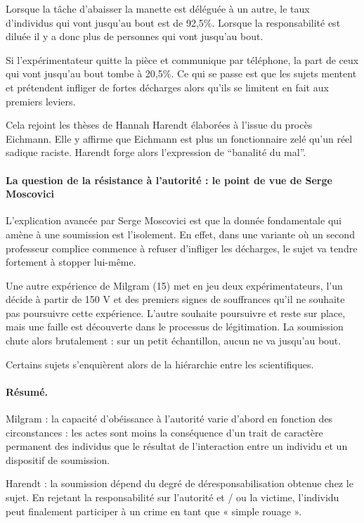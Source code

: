 	Lorsque la tâche d'abaisser la manette est déléguée à un autre, le taux d'individus qui vont jusqu'au bout est de 92,5\%.
	Lorsque la responsabilité est diluée il y a donc plus de personnes qui vont jusqu'au bout.

	Si l'expérimentateur quitte la pièce et communique par téléphone, la part de ceux qui vont jusqu'au bout tombe à 20,5\%. Ce qui se passe est que les sujets mentent et prétendent infliger de fortes décharges alors qu'ils se limitent en fait aux premiers leviers.

	Cela rejoint les thèses de Hannah Harendt élaborées à l'issue du procès Eichmann.
	Elle y affirme que Eichmann est plus un fonctionnaire zelé qu'un réel sadique raciste.
	Harendt forge alors l'expression de “banalité du mal”.

	\paragraph{La question de la résistance à l'autorité : le point de vue de Serge Moscovici}

	L'explication avancée par Serge Moscovici est que la donnée fondamentale qui amène à une soumission est l'isolement.
	En effet, dans une variante où un second professeur complice commence à refuser d'infliger les décharges, le sujet va tendre fortement à stopper lui-même.

	Une autre expérience de Milgram (15) met en jeu deux expérimentateurs, l'un décide à partir de 150 V et des premiers signes de souffrances qu'il ne souhaite pas poursuivre cette expérience.
	L'autre souhaite poursuivre et reste sur place, mais une faille est découverte dans le processus de légitimation.
	La soumission chute alors brutalement : sur un petit échantillon, aucun ne va jusqu'au bout.

	Certains sujets s'enquièrent alors de la hiérarchie entre les scientifiques.

	\paragraph{Résumé.}
	Milgram : la capacité d'obéissance à l'autorité varie d'abord en fonction des circonstances : les actes sont moins la conséquence d'un trait de caractère permanent des individus que le résultat de l'interaction entre un individu et un dispositif de soumission.

	Harendt : la soumission dépend du degré de déresponsabilisation obtenue chez le sujet.
	En rejetant la responsabilité sur l'autorité et / ou la victime, l'individu peut finalement participer à un crime en tant que « simple rouage ».
	
